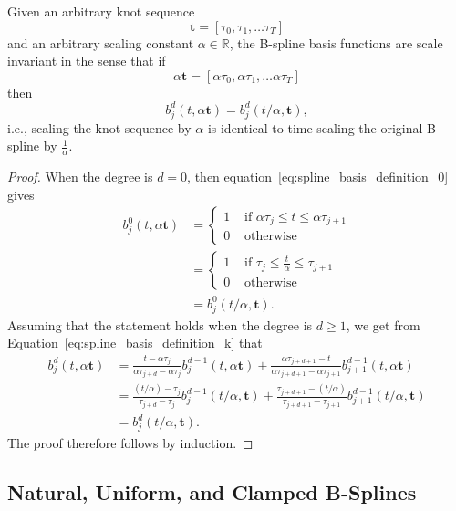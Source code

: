 \begin{lemma}\label{lem:bases_are_scale_invariant}
Given an arbitrary knot sequence
\[
\mathbf{t} = [\tau_0, \tau_1, \dots \tau_T]
\]
and an arbitrary scaling constant $\alpha\in\mathbb{R}$, the B-spline basis functions are scale invariant in the sense that
if 
\[
\alpha\mathbf{t} = [\alpha\tau_0, \alpha\tau_1, \dots \alpha\tau_T]
\]
then
\[
b_j^d(t,  \alpha\mathbf{t}) = b_j^d(t/\alpha, \mathbf{t}),
\]
i.e., scaling the knot sequence by $\alpha$ is identical to time scaling the original B-spline by $\frac{1}{\alpha}$.
\end{lemma}
\begin{proof}
When the degree is $d=0$, then equation~\eqref{eq:spline_basis_definition_0} gives
\begin{align*}
	b_j^0(t,  \alpha\mathbf{t}) 
		&= \begin{cases} 1 & \text{~if~} \alpha\tau_j \leq t \leq \alpha\tau_{j+1} \\ 
 						 0 & \text{~otherwise} 
 			\end{cases} \\
 		&= \begin{cases} 1 & \text{~if~} \tau_j \leq \frac{t}{\alpha} \leq \tau_{j+1} \\ 
 						 0 & \text{~otherwise} 
 			\end{cases} \\ 	
 		&= b_j^0(t/\alpha, \mathbf{t}).
\end{align*}
Assuming that the statement holds when the degree is $d\geq 1$, we get from 
Equation~\eqref{eq:spline_basis_definition_k} that
\begin{align*}
b_j^d(t,  \alpha\mathbf{t}) &= \frac{t-\alpha\tau_j}{\alpha\tau_{j+d}-
\alpha\tau_j} b_j^{d-1}(t,  \alpha\mathbf{t}) + \frac{\alpha\tau_{j+d+1}-t}{\alpha\tau_{j+d+1}-\alpha\tau_{j+1}} b_{j+1}^{d-1}(t,  \alpha\mathbf{t}) \\
&= \frac{(t/\alpha)-\tau_j}{\tau_{j+d}-
\tau_j} b_j^{d-1}(t/\alpha, \mathbf{t}) + \frac{\tau_{j+d+1}-(t/\alpha)}{\tau_{j+d+1}-\tau_{j+1}} b_{j+1}^{d-1}(t/\alpha, \mathbf{t}) \\
&= b_j^d(t/\alpha, \mathbf{t}).
\end{align*}
The proof therefore follows by induction.
\end{proof}


\subsection{Natural, Uniform, and Clamped B-Splines}

